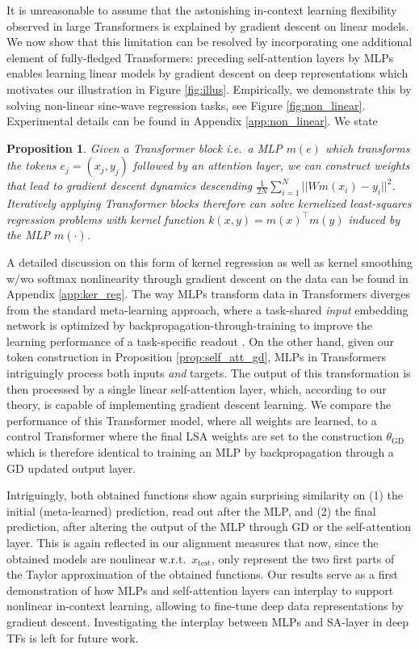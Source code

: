 \documentclass{article}
\newtheorem{prop}{Proposition}
\theoremstyle{plain}
\theoremstyle{definition}
\theoremstyle{remark}
\begin{document}
It is unreasonable to assume that the astonishing in-context learning flexibility observed in large Transformers is explained by gradient descent on linear models. We now show that this limitation can be resolved by incorporating one additional element of fully-fledged Transformers: preceding self-attention layers by MLPs enables learning linear models by gradient descent on deep representations which motivates our illustration in Figure \ref{fig:illus}. Empirically, we demonstrate this by solving non-linear sine-wave regression tasks, see Figure \ref{fig:non_linear}. Experimental details can be found in Appendix \ref{app:non_linear}.
We state 
\begin{prop}
\label{prop:kernel}
Given a Transformer block i.e.~a MLP $m(e)$ which transforms the tokens $e_j=(x_j, y_j)$ followed by an attention layer, we can construct weights that lead to gradient descent dynamics descending $\frac{1}{2N}\sum_{i=1}^N||W m(x_i)  -y_i||^2$. Iteratively applying Transformer blocks therefore can solve kernelized least-squares regression problems with kernel function $k(x,y)=m(x)^\top m(y)$ induced by the MLP $m(\cdot)$.
\end{prop}
A detailed discussion on this form of kernel regression as well as kernel smoothing w/wo softmax nonlinearity through gradient descent on the data can be found in Appendix \ref{app:ker_reg}. The way MLPs transform data in Transformers diverges from the standard meta-learning approach, where a task-shared \textit{input} embedding network is optimized by backpropagation-through-training to improve the learning performance of a task-specific readout \citep[e.g.,][]{raghu_rapid_2020,meta_opt_net,bertinetto_meta-learning_2019}. On the other hand, given our token construction in Proposition \ref{prop:self_att_gd}, MLPs in Transformers intriguingly process both inputs \emph{and} targets. The output of this transformation is then processed by a single linear self-attention layer, which, according to our theory, is capable of implementing gradient descent learning. We compare the performance of this Transformer model, where all weights are learned, to a control Transformer where the final LSA weights are set to the construction $\theta_\text{GD}$ which is therefore identical to training an MLP by backpropagation through a GD updated output layer.

Intriguingly, both obtained functions show again surprising similarity on (1) the initial (meta-learned) prediction, read out after the MLP, and (2) the final prediction, after altering the output of the MLP through GD or the self-attention layer. This is again reflected in our alignment measures that now, since the obtained models are nonlinear w.r.t.~$x_{\text{test}}$, only represent the two first parts of the Taylor approximation of the obtained functions. 
Our results serve as a first demonstration of how MLPs and self-attention layers can interplay to support nonlinear in-context learning, allowing to fine-tune deep data representations by gradient descent. Investigating the interplay between MLPs and SA-layer in deep TFs is left for future work.
\end{document}

